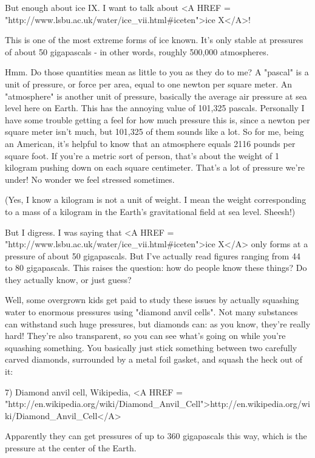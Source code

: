 But enough about ice IX.  I want to talk about 
<A HREF = "http://www.lsbu.ac.uk/water/ice_vii.html#iceten">ice X</A>!

This is one of the most extreme forms of ice known.  It's only stable
at pressures of about 50 gigapascals - in other words, roughly 500,000 
atmospheres.

Hmm.  Do those quantities mean as little to you as they do to me?  A
"pascal" is a unit of pressure, or force per area, equal to
one newton per square meter.  An "atmosphere" is another
unit of pressure, basically the average air pressure at sea level here
on Earth.  This has the annoying value of 101,325 pascals.  Personally
I have some trouble getting a feel for how much pressure this is,
since a newton per square meter isn't much, but 101,325 of them sounds
like a lot.  So for me, being an American, it's helpful to know that
an atmosphere equals 2116 pounds per square foot.  If you're a metric
sort of person, that's about the weight of 1 kilogram pushing down on
each square centimeter.  That's a lot of pressure we're under!  No
wonder we feel stressed sometimes.

(Yes, I know a kilogram is not a unit of weight.  I mean the weight
corresponding to a mass of a kilogram in the Earth's gravitational field 
at sea level.  Sheesh!)

But I digress.  I was saying that 
<A HREF = "http://www.lsbu.ac.uk/water/ice_vii.html#iceten">ice X</A>
only forms at a pressure 
of about 50 gigapascals.  But I've actually read figures ranging
from 44 to 80 gigapascals.  This raises the question: how do people 
know these things?  Do they actually know, or just guess?  

Well, some overgrown kids get paid to study these issues by actually
squashing water to enormous pressures using "diamond anvil 
cells".  
Not many substances can withstand such huge pressures, but diamonds 
can: as you know, they're really hard!  They're also transparent,
so you can see what's going on while you're squashing something.  
You basically just stick something between two carefully carved
diamonds, surrounded by a metal foil gasket, and squash the heck
out of it:

7) Diamond anvil cell, Wikipedia, 
<A HREF = "http://en.wikipedia.org/wiki/Diamond_Anvil_Cell">http://en.wikipedia.org/wiki/Diamond_Anvil_Cell</A>

Apparently they can get pressures of up to 360 gigapascals this way, 
which is the pressure at the center of the Earth.

